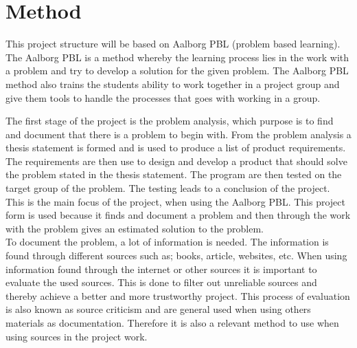 \section{Method}
This project structure will be based on Aalborg PBL (problem based learning). The Aalborg PBL is a method whereby the learning process lies in the work with a problem and try to develop a solution for the given problem.
The Aalborg PBL method also trains the students ability to work together in a project group and give them tools to handle the processes that goes with working in a group.

The first stage of the project is the problem analysis, which purpose is to find and document that there is a problem to begin with. From the problem analysis a thesis statement is formed and is used to produce a list of product requirements.
The requirements are then use to design and develop a product that should solve the problem stated in the thesis statement.
The program are then tested on the target group of the problem. The testing leads to a conclusion of the project. This is the main focus of the project, when using the Aalborg PBL.
This project form is used because it finds and document a problem and then through the work with the problem gives an estimated solution to the problem.\\

To document the problem, a lot of information is needed. The information is found through different sources such as; books, article, websites, etc. When using information found through the internet or other sources it is important to evaluate the used sources.
This is done to filter out unreliable sources and thereby achieve a better and more trustworthy project.
This process of evaluation is also known as source criticism and are general used when using others materials as documentation. Therefore it is also a relevant method to use when using sources in the project work.\\
